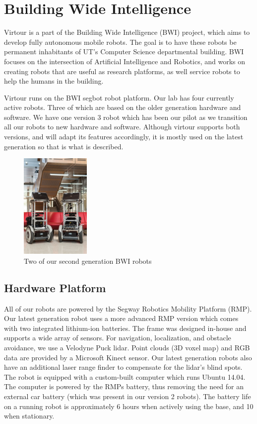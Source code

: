 \documentclass[
  oneside,
  11pt, a4paper,
  footinclude=true,
  headinclude=true,
  cleardoublepage=empty
]{article}
\begin{document}
\section{Building Wide Intelligence}

Virtour is a part of the Building Wide Intelligence (BWI) project, which aims
to develop fully autonomous mobile robots. The goal is to have these robots be
permanent inhabitants of UT's Computer Science departmental building. BWI
focuses on the intersection of Artificial Intelligence and Robotics, and works
on creating robots that are useful as research platforms, as well service
robots to help the humans in the building.

Virtour runs on the BWI segbot robot platform. Our lab has four currently
active robots. Three of which are based on the older generation hardware and
software. We have one version 3 robot which has been our pilot as we transition
all our robots to new hardware and software. Although virtour supports both
versions, and will adapt its features accordingly, it is mostly used on the
latest generation so that is what is described.

\begin{figure}
\centering
\includegraphics[height=2in]{bwi}
\caption{Two of our second generation BWI robots}
\end{figure}

\subsection{Hardware Platform}

All of our robots are powered by the Segway Robotics Mobility Platform (RMP).
Our latest generation robot uses a more advanced RMP version which comes with
two integrated lithium-ion batteries. The frame was designed in-house and
supports a wide array of sensors. For navigation, localization, and obstacle
avoidance, we use a Velodyne Puck lidar. Point clouds (3D voxel map) and RGB
data are provided by a Microsoft Kinect sensor. Our latest generation robots
also have an additional laser range finder to compensate for the lidar's blind
spots. The robot is equipped with a custom-built computer which runs Ubuntu
14.04. The computer is powered by the RMPs battery, thus removing the need for
an external car battery (which was present in our version 2 robots).  The
battery life on a running robot is approximately 6 hours when actively using
the base, and 10 when stationary.
\end{document}
